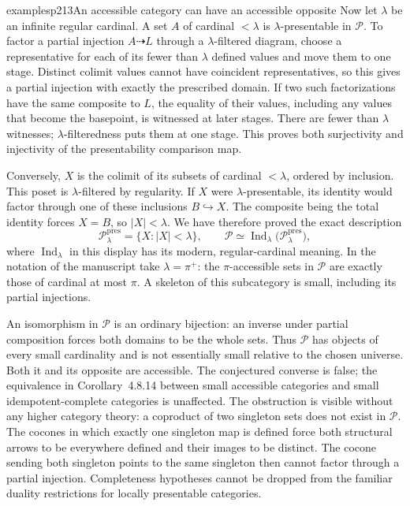 \begin{dcomment}{examples}{p213}{An accessible category can have an accessible opposite}
Now let $\lambda$ be an infinite regular cardinal. A set $A$ of cardinal $<\lambda$ is $\lambda$-presentable in $\mathcal P$. To factor a partial injection $A\dashrightarrow L$ through a $\lambda$-filtered diagram, choose a representative for each of its fewer than $\lambda$ defined values and move them to one stage. Distinct colimit values cannot have coincident representatives, so this gives a partial injection with exactly the prescribed domain. If two such factorizations have the same composite to $L$, the equality of their values, including any values that become the basepoint, is witnessed at later stages. There are fewer than $\lambda$ witnesses; $\lambda$-filteredness puts them at one stage. This proves both surjectivity and injectivity of the presentability comparison map.

Conversely, $X$ is the colimit of its subsets of cardinal $<\lambda$, ordered by inclusion. This poset is $\lambda$-filtered by regularity. If $X$ were $\lambda$-presentable, its identity would factor through one of these inclusions $B\hookrightarrow X$. The composite being the total identity forces $X=B$, so $|X|<\lambda$. We have therefore proved the exact description
\[
 \mathcal P_\lambda^{\mathrm{pres}}
   =\{X:|X|<\lambda\},\qquad
 \mathcal P\simeq
 \operatorname{Ind}_{\lambda}\bigl(\mathcal P_\lambda^{\mathrm{pres}}\bigr),
\]
where $\operatorname{Ind}_{\lambda}$ in this display has its modern, regular-cardinal meaning. In the notation of the manuscript take $\lambda=\pi^+$: the $\pi$-accessible sets in $\mathcal P$ are exactly those of cardinal at most $\pi$. A skeleton of this subcategory is small, including its partial injections.

An isomorphism in $\mathcal P$ is an ordinary bijection: an inverse under partial composition forces both domains to be the whole sets. Thus $\mathcal P$ has objects of every small cardinality and is not essentially small relative to the chosen universe. Both it and its opposite are accessible. The conjectured converse is false; the equivalence in Corollary~4.8.14 between small accessible categories and small idempotent-complete categories is unaffected. The obstruction is visible without any higher category theory: a coproduct of two singleton sets does not exist in $\mathcal P$. The cocones in which exactly one singleton map is defined force both structural arrows to be everywhere defined and their images to be distinct. The cocone sending both singleton points to the same singleton then cannot factor through a partial injection. Completeness hypotheses cannot be dropped from the familiar duality restrictions for locally presentable categories.
\end{dcomment}

